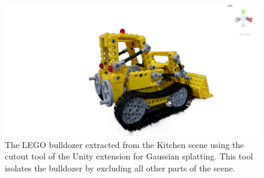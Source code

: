 \documentclass[12pt]{article}
\begin{document}
\begin{figure}[h!]
	\centering
	\includegraphics[width=\textwidth]{Images/WholeTruck.png}
	\caption{The LEGO bulldozer extracted from the Kitchen scene using the cutout tool of the Unity extension for Gaussian splatting. This tool isolates the bulldozer by excluding all other parts of the scene.}
	\label{fig:wholetruck}
\end{figure}
\FloatBarrier
\noindent
\end{document}
